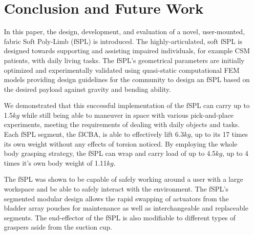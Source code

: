 \documentclass[letterpaper, 10 pt, conference]{ieeeconf}  %
\begin{document}



\section{Conclusion and Future Work}

In this paper, the design, development, and evaluation of a novel, user-mounted, fabric Soft Poly-Limb (fSPL) is introduced. The highly-articulated, soft fSPL is designed towards supporting and assisting impaired individuals, for example CSM patients, with daily living tasks. The fSPL’s geometrical parameters are initially optimized and experimentally validated using quasi-static computational FEM models providing design guidelines for the community to design an fSPL based on the desired payload against gravity and bending ability.

We demonstrated that this successful implementation of the fSPL can carry up to 1.5$kg$ while still being able to maneuver in space with various pick-and-place experiments, meeting the requirements of dealing with daily objects and tasks. Each fSPL segment, the f3CBA, is able to effectively lift 6.3$kg$, up to its 17 times its own weight without any effects of torsion noticed. By employing the whole body grasping strategy, the fSPL can wrap and carry load of up to 4.5$kg$, up to 4 times it’s own body weight of 1.11$kg$.

The fSPL was shown to be capable of safely working around a user with a large workspace and be able to safely interact with the environment. The fSPL’s segmented modular design allows the rapid swapping of actuators from the bladder array pouches for maintenance as well as interchangeable and replaceable segments. The end-effector of the fSPL is also modifiable to different types of graspers aside from the suction cup.
\end{document}
